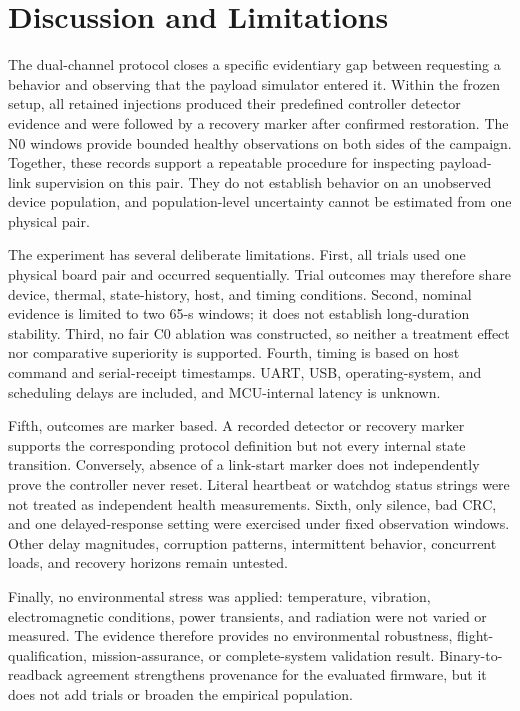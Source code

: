 \documentclass[conference]{IEEEtran}
\begin{document}
\section{Discussion and Limitations}

The dual-channel protocol closes a specific evidentiary gap between requesting a behavior and observing that the payload simulator entered it. Within the frozen setup, all retained injections produced their predefined controller detector evidence and were followed by a recovery marker after confirmed restoration. The N0 windows provide bounded healthy observations on both sides of the campaign. Together, these records support a repeatable procedure for inspecting payload-link supervision on this pair. They do not establish behavior on an unobserved device population, and population-level uncertainty cannot be estimated from one physical pair.

The experiment has several deliberate limitations. First, all trials used one physical board pair and occurred sequentially. Trial outcomes may therefore share device, thermal, state-history, host, and timing conditions. Second, nominal evidence is limited to two 65-s windows; it does not establish long-duration stability. Third, no fair C0 ablation was constructed, so neither a treatment effect nor comparative superiority is supported. Fourth, timing is based on host command and serial-receipt timestamps. UART, USB, operating-system, and scheduling delays are included, and MCU-internal latency is unknown.

Fifth, outcomes are marker based. A recorded detector or recovery marker supports the corresponding protocol definition but not every internal state transition. Conversely, absence of a link-start marker does not independently prove the controller never reset. Literal heartbeat or watchdog status strings were not treated as independent health measurements. Sixth, only silence, bad CRC, and one delayed-response setting were exercised under fixed observation windows. Other delay magnitudes, corruption patterns, intermittent behavior, concurrent loads, and recovery horizons remain untested.

Finally, no environmental stress was applied: temperature, vibration, electromagnetic conditions, power transients, and radiation were not varied or measured. The evidence therefore provides no environmental robustness, flight-qualification, mission-assurance, or complete-system validation result. Binary-to-readback agreement strengthens provenance for the evaluated firmware, but it does not add trials or broaden the empirical population.
\end{document}
